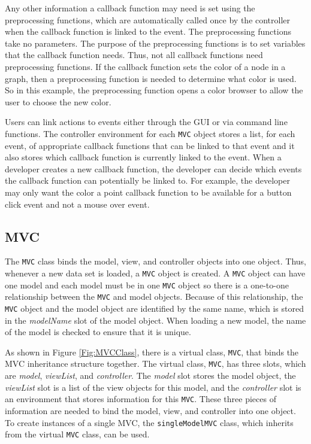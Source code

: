 \documentclass{article}[11pt]
\newcommand{\Robject}[1]{{\texttt{#1}}}
\newcommand{\Rslot}[1]{\textsl{#1}}
\newcommand{\Rclass}[1]{\texttt{#1}}
\begin{document}
Any other information a callback function may need is set using the
preprocessing functions, which are automatically called once by the controller
when the callback function is linked to the event.  The preprocessing
functions take no parameters.  The purpose of the preprocessing functions is
to set variables that the callback function needs.  Thus, not all callback
functions need preprocessing functions.  If the callback
function sets the color of a node in a graph, then a preprocessing
function is needed to determine what color is used.  So in this
example, the preprocessing function opens a color browser to allow the
user to choose the new color.

Users can link actions to events either through the GUI or via
command line functions.  The controller environment for each \Robject{MVC}
object stores a list, for each event, of appropriate callback functions that
can be linked to that event and it also stores which callback function is
currently linked to the event.  When a developer creates a new callback
function, the developer can decide which events the callback function can
potentially be linked to.  For example, the developer may only want the color
a point callback function to be available for a button click event and not a
mouse over event.

\subsection{MVC}
\label{Ssec:OneMVC}
 
The \Rclass{MVC} class binds the model, view, and
controller objects into one object.  Thus, whenever a new data set
is loaded, a \Robject{MVC} object is created.  A \Robject{MVC} object can have
one model and each model must be in one \Robject{MVC}
object so there is a one-to-one relationship between the \Robject{MVC} and
model objects.  Because of this relationship, the \Robject{MVC}
object and the model object are identified by the same name, which
is stored in the \Rslot{modelName} slot of the model object.  When
loading a new model, the name of the model is checked to
ensure that it is unique.

As shown in Figure \ref{Fig:MVCClass}, there is a virtual class, \Rclass{MVC},
that binds the MVC inheritance structure together.  The virtual class,
\Rclass{MVC}, has three slots, which are \Rslot{model}, \Rslot{viewList}, and
\Rslot{controller}.  The \Rslot{model} slot stores the model object, the
\Rslot{viewList} slot is a list of the view objects for this model, and the
\Rslot{controller} slot is an environment that stores information for this
\Robject{MVC}.  These three pieces of information are needed to bind the
model, view, and controller into one object.  To create instances of a single
MVC, the \Rclass{singleModelMVC} class, which inherits from the virtual
\Rclass{MVC} class, can be used.  
\end{document}
